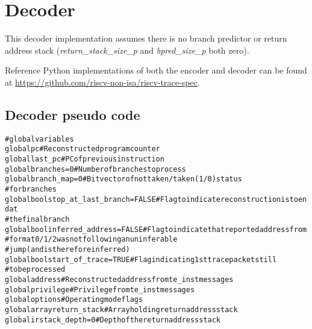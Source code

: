 \chapter{Decoder}

This decoder implementation assumes there is no branch predictor or return address 
stack (\textit{return\_stack\_size\_p} and \textit{bpred\_size\_p} both zero).

Reference Python implementations of both the encoder and decoder can be found at 
\href{https://github.com/riscv-non-isa/riscv-trace-spec}{https://github.com/riscv-non-isa/riscv-trace-spec}.

\section{Decoder pseudo code} \label{Decoder}

\begin{alltt}
# global variables
global       pc                          # Reconstructed program counter
global       last_pc                     # PC of previous instruction
global       branches = 0                # Number of branches to process
global       branch_map = 0              # Bit vector of not taken/taken (1/0) status
                                         #   for branches
global bool  stop_at_last_branch = FALSE # Flag to indicate reconstruction is to end at
                                         #   the final branch
global bool  inferred_address = FALSE    # Flag to indicate that reported address from
                                         #   format 0/1/2 was not following an uninferable
                                         #   jump (and is therefore inferred)
global bool  start_of_trace = TRUE       # Flag indicating 1st trace packet still
                                         #   to be processed
global       address                     # Reconstructed address from te_inst messages
global       privilege                   # Privilege from te_inst messages
global       options                     # Operating mode flags
global array return_stack                # Array holding return address stack
global       irstack_depth = 0           # Depth of the return address stack
\end{alltt}

\pagebreak

